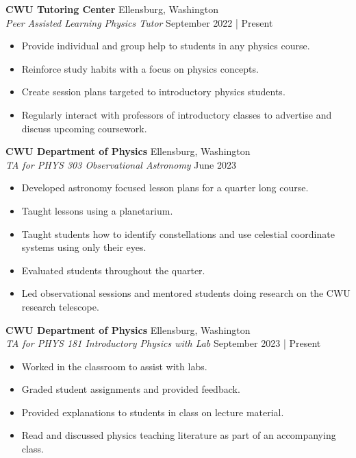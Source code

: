 \documentclass[a4paper,9pt]{extarticle}
\begin{document}
\noindent
\textbf{CWU Tutoring Center} \hfill Ellensburg, Washington\\
\textit{Peer Assisted Learning Physics Tutor} \hfill September 2022 | Present
\begin{itemize}
    \item Provide individual and group help to students in any physics course.
    \item Reinforce study habits with a focus on physics concepts.
    \item Create session plans targeted to introductory physics students.
    \item Regularly interact with professors of introductory classes to advertise and discuss upcoming coursework.
\end{itemize}

\noindent
\textbf{CWU Department of Physics} \hfill Ellensburg, Washington\\
\textit{TA for PHYS 303 Observational Astronomy} \hfill June 2023
\begin{itemize}
    \item Developed astronomy focused lesson plans for a quarter long course.
    \item Taught lessons using a planetarium.
    \item Taught students how to identify constellations and use celestial coordinate systems using only their eyes.
    \item Evaluated students throughout the quarter.
    \item Led observational sessions and mentored students doing research on the CWU research telescope.
\end{itemize}

\noindent
\textbf{CWU Department of Physics} \hfill Ellensburg, Washington\\
\textit{TA for PHYS 181 Introductory Physics with Lab} \hfill September 2023 | Present
\begin{itemize}
    \item Worked in the classroom to assist with labs.
    \item Graded student assignments and provided feedback.
    \item Provided explanations to students in class on lecture material.
    \item Read and discussed physics teaching literature as part of an accompanying class.
\end{itemize}
\end{document}
